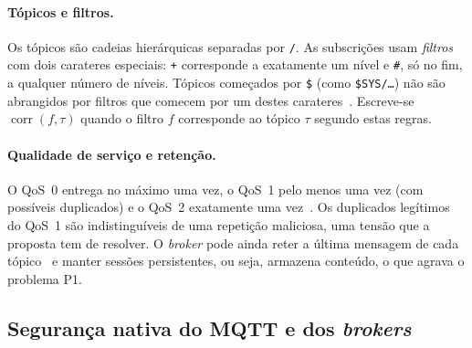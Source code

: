 \paragraph{Tópicos e filtros.} Os tópicos são cadeias hierárquicas separadas por
\texttt{/}. As subscrições usam \emph{filtros} com dois carateres especiais:
\texttt{+} corresponde a exatamente um nível e \texttt{\#}, só no fim, a qualquer
número de níveis. Tópicos começados por \texttt{\$} (como \texttt{\$SYS/\dots}) não
são abrangidos por filtros que comecem por um destes
carateres~\cite[§4.7]{oasis-mqtt311}. Escreve-se
$\operatorname{corr}(f, \tau)$ quando o filtro $f$ corresponde ao tópico $\tau$
segundo estas regras.

\paragraph{Qualidade de serviço e retenção.} O QoS~0 entrega no máximo uma vez, o
QoS~1 pelo menos uma vez (com possíveis duplicados) e o QoS~2 exatamente uma
vez~\cite[§4.3]{oasis-mqtt311}.
Os duplicados legítimos do QoS~1 são indistinguíveis de uma repetição maliciosa,
uma tensão que a proposta tem de resolver. O \emph{broker} pode ainda reter a
última mensagem de cada tópico~\cite[§3.3.1.3]{oasis-mqtt311} e manter sessões
persistentes, ou seja, armazena
conteúdo, o que agrava o problema P1.

\subsection{Segurança nativa do MQTT e dos \emph{brokers}}
\label{sec:seguranca-nativa}

